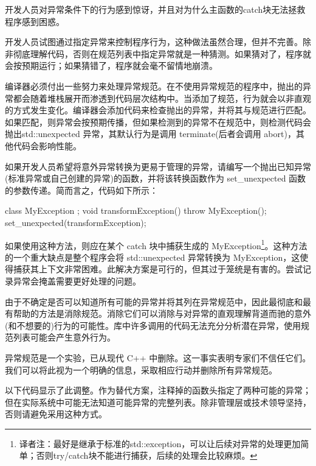 开发人员对异常条件下的行为感到惊讶，并且对为什么主函数的catch块无法拯救程序感到困惑。


开发人员试图通过指定异常来控制程序行为，这种做法虽然合理，但并不完善。除非彻底理解代码，否则在规范列表中指定异常就是一种猜测。如果猜对了，程序就会按预期运行；如果猜错了，程序就会毫不留情地崩溃。

编译器必须付出一些努力来处理异常规范。在不使用异常规范的程序中，抛出的异常都会随着堆栈展开而渗透到代码层次结构中。当添加了规范，行为就会以非直观的方式发生变化。编译器会添加代码来检查抛出的异常，并将其与规范进行匹配。如果匹配，则异常会按预期传播，但如果检测到的异常不在规范中，则检测代码会抛出std::unexpected 异常，其默认行为是调用 terminate(后者会调用 abort)，其他代码会影响性能。

如果开发人员希望将意外异常转换为更易于管理的异常，请编写一个抛出已知异常(标准异常或自己创建的异常)的函数，并将该转换函数作为 set\_unexpected 函数的参数传递。简而言之，代码如下所示：

\begin{cpp}
class MyException {};
void transformException() { throw MyException(); }
set_unexpected(transformException);
\end{cpp}

如果使用这种方法，则应在某个 catch 块中捕获生成的 MyException\footnote{译者注：最好是继承于标准的std::exception，可以让后续对异常的处理更加简单；否则try/catch块不能进行捕获，后续的处理会比较麻烦。}。这种方法的一个重大缺点是整个程序会将 std::unexpected 异常转换为 MyException，这使得捕获其上下文非常困难。此解决方案是可行的，但其过于笼统是有害的。尝试记录异常会掩盖需要更好处理的问题。


由于不确定是否可以知道所有可能的异常并将其列在异常规范中，因此最彻底和最有帮助的方法是消除规范。消除它们可以消除与对异常的直观理解背道而驰的意外(和不想要的)行为的可能性。库中许多调用的代码无法充分分析潜在异常，使用规范列表可能会产生意外行为。

异常规范是一个实验，已从现代 C++ 中删除。这一事实表明专家们不信任它们。我们可以将此视为一个明确的信息，采取相应行动并删除所有异常规范。

以下代码显示了此调整。作为替代方案，注释掉的函数头指定了两种可能的异常；但在实际系统中可能无法知道可能异常的完整列表。除非管理层或技术领导坚持，否则请避免采用这种方式。


